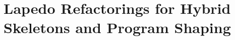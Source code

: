 \documentclass[final]{jfp1}
\newcommand{\lapedo}{\xspace{\sc Lapedo}\xspace}
\newcommand{\Lapedo}{\lapedo}
\begin{document}

\section{\Lapedo{} Refactorings for Hybrid Skeletons and Program Shaping}
\label{lapedo-refactorings}

%



\end{document}
